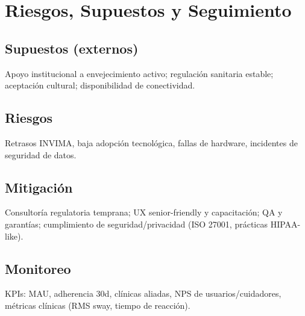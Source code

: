 \section{Riesgos, Supuestos y Seguimiento}
\subsection{Supuestos (externos)}
Apoyo institucional a envejecimiento activo; regulación sanitaria estable; aceptación cultural; disponibilidad de conectividad. 
\subsection{Riesgos}
Retrasos INVIMA, baja adopción tecnológica, fallas de hardware, incidentes de seguridad de datos. 
\subsection{Mitigación}
Consultoría regulatoria temprana; UX senior-friendly y capacitación; QA y garantías; cumplimiento de seguridad/privacidad (ISO 27001, prácticas HIPAA-like).
\subsection{Monitoreo}
KPIs: MAU, adherencia 30d, clínicas aliadas, NPS de usuarios/cuidadores, métricas clínicas (RMS sway, tiempo de reacción).
